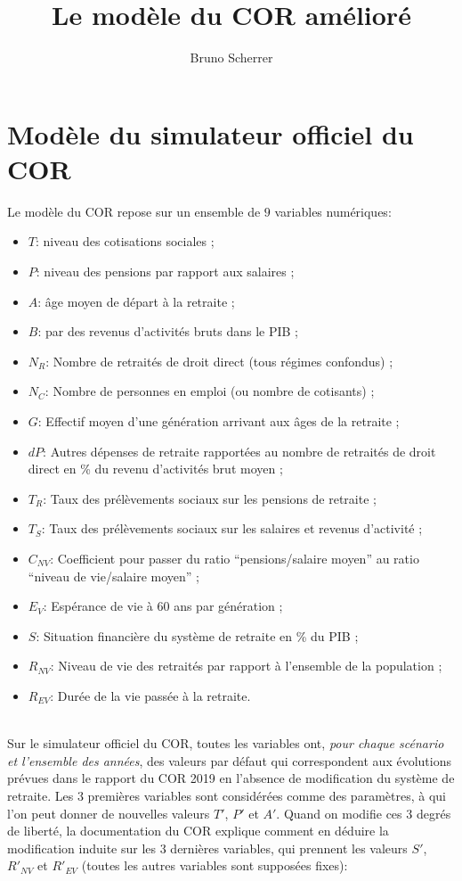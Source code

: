 \documentclass[10pt]{article}
\title{Le modèle du COR amélioré}
\author{Bruno Scherrer}
\begin{document}
\maketitle

\section{Modèle du simulateur officiel du COR}

  Le modèle du COR repose sur un ensemble de $9$ variables numériques:
  \begin{itemize}
  \item $T$: niveau des cotisations sociales ;
  \item $P$: niveau des pensions par rapport aux salaires ;
  \item $A$: âge moyen de départ à la retraite ;
  \item $B$: par des revenus d'activités bruts dans le PIB ;
  \item $N_R$: Nombre de retraités de droit direct (tous régimes confondus) ;
  \item $N_C$: Nombre de personnes en emploi (ou nombre de cotisants) ;
  \item $G$: Effectif moyen d'une génération arrivant aux âges de la retraite ;
  \item $dP$: Autres dépenses de retraite rapportées au nombre de retraités de droit direct en \% du revenu d'activités brut moyen ;
  \item $T_R$: Taux des prélèvements sociaux sur les pensions de retraite ;
  \item $T_S$: Taux des prélèvements sociaux sur les salaires et revenus d'activité ;
  \item $C_{NV}$: Coefficient pour passer du ratio ``pensions/salaire moyen'' au ratio ``niveau de vie/salaire moyen'' ;
  \item $E_V$: Espérance de vie à 60 ans par génération ;
  \item $S$: Situation financière du système de retraite en \% du PIB ;
  \item $R_{NV}$: Niveau de vie des retraités par rapport à l'ensemble de la population ;
    \item $R_{EV}$: Durée de la vie passée à la retraite.
  \end{itemize}

~\\
  
  Sur le simulateur officiel du COR, toutes les variables ont, \emph{pour chaque scénario et l'ensemble des années}, des valeurs par défaut qui correspondent aux évolutions prévues dans le rapport du COR 2019 en l'absence de modification du système de retraite. Les 3 premières variables sont considérées comme des paramètres, à qui l'on peut donner de nouvelles valeurs $T'$, $P'$ et $A'$. Quand on modifie ces 3 degrés de liberté, la documentation du COR explique comment en déduire la modification induite sur les 3 dernières variables, qui prennent les valeurs $S'$, $R'_{NV}$ et $R'_{EV}$ (toutes les autres variables sont supposées fixes):
\end{document}
